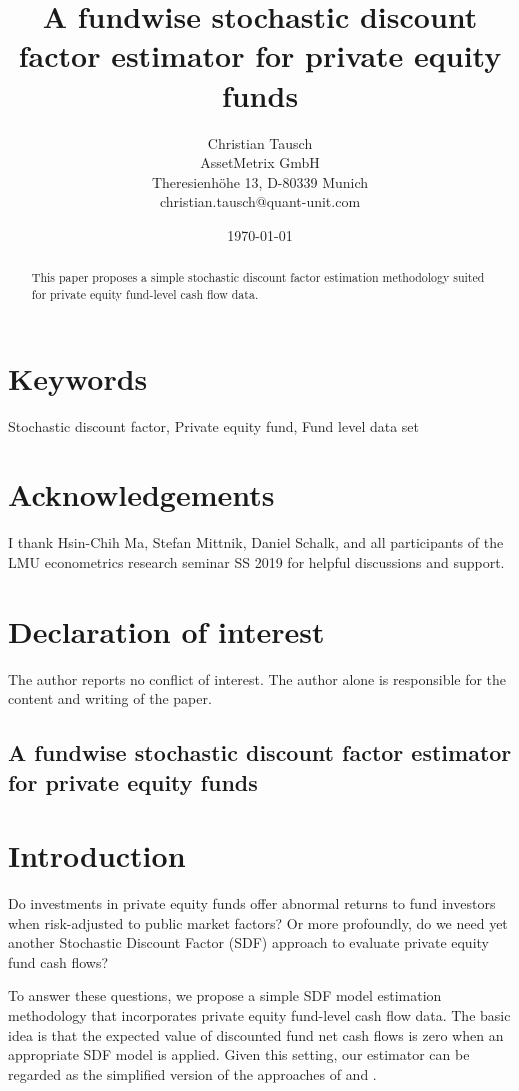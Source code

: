 \documentclass[12pt]{article}
\title{A fundwise stochastic discount factor estimator for private equity funds}
\author{
	Christian Tausch  \\
	AssetMetrix GmbH  \\
	Theresienh\"{o}he 13, D-80339 Munich \\
	christian.tausch@quant-unit.com \\
	}
\date{\today}
\begin{document}
\maketitle


\section*{Keywords}
Stochastic discount factor, Private equity fund, Fund level data set


\section*{Acknowledgements}
I thank Hsin-Chih Ma, Stefan Mittnik, Daniel Schalk, and all participants of the LMU econometrics research seminar SS 2019 for helpful discussions and support.


\section*{Declaration of interest}
The author reports no conflict of interest. 
The author alone is responsible for the content and writing of the paper.


\newpage

\begin{center} 
\section*{A fundwise stochastic discount factor estimator for private equity funds}
\end{center}



\begin{abstract}
This paper proposes a simple stochastic discount factor estimation methodology suited for private equity fund-level cash flow data.
\end{abstract}

\section{Introduction}
Do investments in private equity funds offer abnormal returns to fund investors when risk-adjusted to public market factors?
Or more profoundly, do we need yet another Stochastic Discount Factor (SDF) approach to evaluate private equity fund cash flows?

To answer these questions, we propose a simple SDF model estimation methodology that incorporates private equity fund-level cash flow data.
The basic idea is that the expected value of discounted fund net cash flows is zero when an appropriate SDF model is applied.
Given this setting, our estimator can be regarded as the simplified version of the approaches of \cite{DLP12} and \cite{KN16}.
\end{document}
